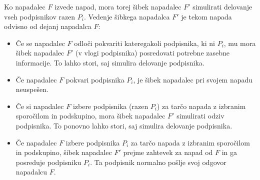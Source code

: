 \begin{dokaz}
    Ko napadalec $F$ izvede napad, mora torej šibek napadalec $F'$ simulirati delovanje vseh podpisnikov
    razen $P_i$. Vedenje šibkega napadalca $F'$ je tekom napada odvisno od dejanj napadalca $F$:
    \begin{itemize}
        \item Če se napadalec $F$ odloči pokvariti kateregakoli podpisnika, ki ni $P_i$, mu mora 
            šibek napadalec $F'$ (v vlogi podpisnika) posredovati potrebne zasebne informacije. To
            lahko stori, saj simulira delovanje podpisnika.
        \item Če napadalec $F$ pokvari podpisnika $P_i$, je šibek napadalec pri svojem napadu neuspešen.
        \item Če si napadalec $F$ izbere podpisnika (razen $P_i$) za tarčo napada z izbranim sporočilom
            in podskupino, mora šibek napadalec $F'$ simulirati odziv podpisnika. To ponovno lahko
            stori, saj simulira delovanje podpisnika.
        \item Če napadalec $F$ izbere podpisnika $P_i$ za tarčo napada z izbranim sporočilom in podskupino,
            šibek napadalec $F'$ prejme zahtevek za napad od $F$ in ga posreduje podpisniku $P_i$.
            Ta podpisnik normalno pošlje svoj odgovor napadalcu $F$.
    \end{itemize}


\end{dokaz}

